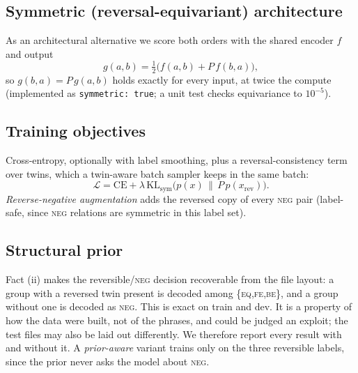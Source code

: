 \documentclass[11pt,a4paper]{article}
\newcommand{\EQ}{\textsc{eq}}
\newcommand{\FE}{\textsc{fe}}
\newcommand{\BE}{\textsc{be}}
\newcommand{\NEG}{\textsc{neg}}
\begin{document}
\subsection{Symmetric (reversal-equivariant) architecture}
As an architectural alternative we score both orders with the shared encoder
$f$ and output
\begin{equation}
  g(a,b) = \tfrac12\bigl(f(a,b) + P\,f(b,a)\bigr),
\end{equation}
so $g(b,a)=P\,g(a,b)$ holds exactly for every input, at twice the compute
(implemented as \texttt{symmetric: true}; a unit test checks equivariance to
$10^{-5}$).

\subsection{Training objectives}
Cross-entropy, optionally with label smoothing, plus a reversal-consistency
term over twins, which a twin-aware batch sampler keeps in the same batch:
\begin{equation}
  \mathcal{L} = \mathrm{CE} + \lambda\,\mathrm{KL}_{\mathrm{sym}}\bigl(p(x)\,\|\,P\,p(x_{\mathrm{rev}})\bigr).
\end{equation}
\emph{Reverse-negative augmentation} adds the reversed copy of every \NEG{}
pair (label-safe, since \NEG{} relations are symmetric in this label set).

\subsection{Structural prior}
Fact (ii) makes the reversible/\NEG{} decision recoverable from the file layout:
a group with a reversed twin present is decoded among \{\EQ,\FE,\BE\}, and a
group without one is decoded as \NEG. This is exact on train and dev. It is a
property of how the data were built, not of the phrases, and could be judged
an exploit; the test files may also be laid out differently. We therefore
report every result with and without it. A \emph{prior-aware} variant trains
only on the three reversible labels, since the prior never asks the model
about \NEG.
\end{document}
